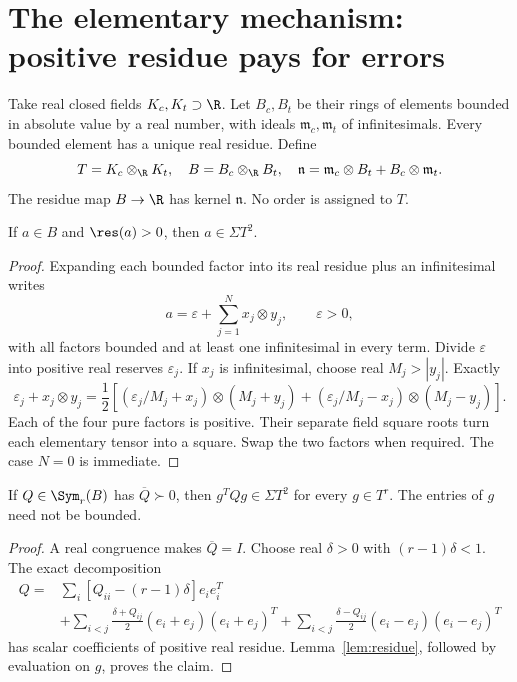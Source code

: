 \section{The elementary mechanism: positive residue pays for errors}\label{sec:mechanism}
Take real closed fields $K_c,K_t\supset\R$. Let $B_c,B_t$ be their rings of elements bounded in absolute value by a real number, with ideals $\mathfrak m_c,\mathfrak m_t$ of infinitesimals. Every bounded element has a unique real residue. Define
\[
T=K_c\otimes_{\R}K_t,\quad B=B_c\otimes_{\R}B_t,\quad
\mathfrak n=\mathfrak m_c\otimes B_t+B_c\otimes\mathfrak m_t.
\]
The residue map $B\to\R$ has kernel $\mathfrak n$. No order is assigned to $T$.

\begin{lemma}\label{lem:residue}
If $a\in B$ and $\res(a)>0$, then $a\in\Sigma T^2$.
\end{lemma}
\begin{proof}
Expanding each bounded factor into its real residue plus an infinitesimal writes
\[a=\varepsilon+\sum_{j=1}^N x_j\otimes y_j,\qquad\varepsilon>0,
\]
with all factors bounded and at least one infinitesimal in every term. Divide $\varepsilon$ into positive real reserves $\varepsilon_j$. If $x_j$ is infinitesimal, choose real $M_j>|y_j|$. Exactly
\[
\varepsilon_j+x_j\otimes y_j=\frac12\left[
(\varepsilon_j/M_j+x_j)\otimes(M_j+y_j)+
(\varepsilon_j/M_j-x_j)\otimes(M_j-y_j)\right].
\]
Each of the four pure factors is positive. Their separate field square roots turn each elementary tensor into a square. Swap the two factors when required. The case $N=0$ is immediate.
\end{proof}

\begin{lemma}\label{lem:gram}
If $Q\in\Sym_r(B)$ has $\overline Q\succ0$, then $g^TQg\in\Sigma T^2$ for every $g\in T^r$. The entries of $g$ need not be bounded.
\end{lemma}
\begin{proof}
A real congruence makes $\overline Q=I$. Choose real $\delta>0$ with $(r-1)\delta<1$. The exact decomposition
\begin{align*}
Q={}&\sum_i[Q_{ii}-(r-1)\delta]e_ie_i^T\\
 &+\sum_{i<j}\frac{\delta+Q_{ij}}2(e_i+e_j)(e_i+e_j)^T
 +\sum_{i<j}\frac{\delta-Q_{ij}}2(e_i-e_j)(e_i-e_j)^T
\end{align*}
has scalar coefficients of positive real residue. Lemma~\ref{lem:residue}, followed by evaluation on $g$, proves the claim.
\end{proof}
